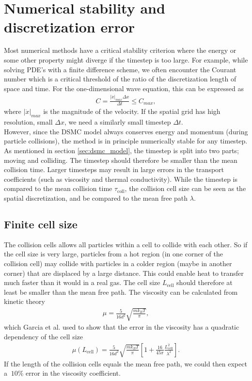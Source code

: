 \section{Numerical stability and discretization error}
\label{sec:dsmc_stability}
Most numerical methods have a critical stability criterion where the energy or some other property might diverge if the timestep is too large. For example, while solving PDE's with a finite difference scheme, we often encounter the Courant number which is a critical threshold of the ratio of the discretization length of space and time. For the one-dimensional wave equation, this can be expressed as
\begin{align}
	C = \frac{|\dot x|_{max} \Delta x}{\Delta t} \leq C_{max},
\end{align}
where $|\dot x|_{max}$ is the magnitude of the velocity. If the spatial grid has high resolution, small $\Delta x$, we need a similarly small timestep $\Delta t$.\\
However, since the DSMC model always conserves energy and momentum (during particle collisions), the method is in principle numerically stable for any timestep. As mentioned in section \ref{sec:dsmc_model}, the timestep is split into two parts; moving and colliding. The timestep should therefore be smaller than the mean collision time. Larger timesteps may result in large errors in the transport coefficients (such as viscosity and thermal conductivity)\cite{karniadakis2005microflows}. While the timestep is compared to the mean collision time $\tau_\text{coll}$, the collision cell size can be seen as the spatial discretization, and be compared to the mean free path $\lambda$. 
\subsection{Finite cell size}
The collision cells allows all particles within a cell to collide with each other. So if the cell size is very large, particles from a hot region (in one corner of the collision cell) may collide with particles in a colder region (maybe in another corner) that are displaced by a large distance. This could enable heat to transfer much faster than it would in a real gas. The cell size $L_\text{cell}$ should therefore at least be smaller than the mean free path\cite{karniadakis2005microflows}. The viscosity can be calculated from kinetic theory
\begin{align}
	\mu = \frac{5}{16d^2}\sqrt{\frac{mk_B T}{\pi}},
\end{align}
which Garcia et al. \cite{alexander1998cell} used to show that the error in the viscosity has a quadratic dependency of the cell size
\begin{align}
	\label{eq:viscosity_cell_size}
	\mu(L_\text{cell}) = \frac{5}{16d^2}\sqrt{\frac{mk_B T}{\pi}} \left [1 + \frac{16}{45\pi}\frac{L_\text{cell}^2}{\lambda^2}\right].
\end{align}
If the length of the collision cells equals the mean free path, we could then expect a $~10\%$ error in the viscosity coefficient.
